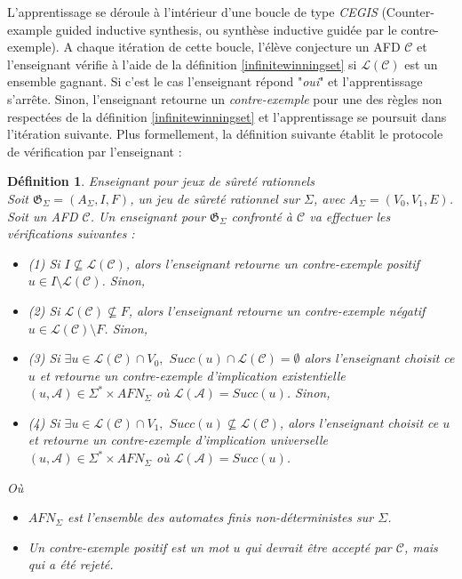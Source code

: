 \documentclass[12pt,a4paper,oneside,titlepage]{report}
\newtheorem{defi}{D\'efinition}[section]
\begin{document}
L'apprentissage se déroule à l'intérieur d'une boucle de type \emph{CEGIS} (Counter-example guided inductive synthesis, ou synthèse inductive guidée par le contre-exemple). A chaque itération de cette boucle, l'élève conjecture un AFD $\mathcal{C}$ et l'enseignant vérifie à l'aide de la définition \ref{infinitewinningset} si $\mathcal{L}(\mathcal{C})$ est un ensemble gagnant. Si c'est le cas l'enseignant répond "\emph{oui}" et l'apprentissage s'arrête. Sinon, l'enseignant retourne un \emph{contre-exemple} pour une des règles non respectées de la définition \ref{infinitewinningset} et l'apprentissage se poursuit dans l'itération suivante. Plus formellement, la définition suivante établit le protocole de vérification par l'enseignant :
\begin{defi}{Enseignant pour jeux de sûreté rationnels\\}
\label{teacher}
Soit $\mathfrak{G}_\Sigma=(A_\Sigma, I, F)$, un jeu de sûreté rationnel sur $\Sigma$, avec $A_\Sigma=(V_0,V_1,E)$. Soit un AFD $\mathcal{C}$. Un enseignant pour $\mathfrak{G}_\Sigma$ confronté à $\mathcal{C}$ va effectuer les vérifications suivantes :\\
\begin{itemize}
\item (1) Si $I\nsubseteq \mathcal{L}(\mathcal{C})$, alors l'enseignant retourne un \emph{contre-exemple positif} $u\in I\setminus \mathcal{L}(\mathcal{C})$. Sinon,
\item (2) Si $\mathcal{L}(\mathcal{C}) \nsubseteq F$, alors l'enseignant retourne un \emph{contre-exemple négatif} $u\in \mathcal{L}(\mathcal{C})\setminus F$. Sinon, 
\item (3) Si $\exists u\in \mathcal{L}(\mathcal{C})\cap V_0,$ $Succ(u)\cap \mathcal{L}(\mathcal{C})=\emptyset$ alors l'enseignant choisit ce $u$ et retourne un \emph{contre-exemple d'implication existentielle} $(u, \mathcal{A})\in \Sigma^* \times AFN_\Sigma$ où $\mathcal{L}(\mathcal{A})=Succ(u)$. Sinon, 
\item (4) Si $\exists u\in \mathcal{L}(\mathcal{C})\cap V_1,$ $Succ(u)\nsubseteq \mathcal{L}(\mathcal{C})$, alors l'enseignant choisit ce $u$ et retourne un \emph{contre-exemple d'implication universelle} $(u, \mathcal{A})\in \Sigma^* \times AFN_\Sigma$ où $\mathcal{L}(\mathcal{A})=Succ(u)$.
\end{itemize}
Où 
\begin{itemize}
\item $AFN_\Sigma$ est l'ensemble des automates finis non-déterministes sur $\Sigma$.
\item Un \emph{contre-exemple positif} est un mot $u$ qui devrait être accepté par $\mathcal{C}$, mais qui a été rejeté.

\end{itemize}
\end{defi}
\end{document}
